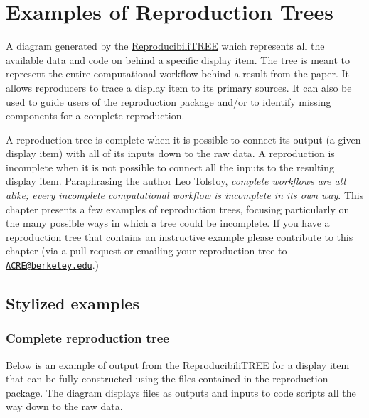 \documentclass[
]{book}
\begin{document}
\hypertarget{examples-of-reproduction-trees}{%
\chapter{Examples of Reproduction Trees}\label{examples-of-reproduction-trees}}

A diagram generated by the \protect\hyperlink{diagram}{ReproducibiliTREE} which represents all the available data and code on behind a specific display item. The tree is meant to represent the entire computational workflow behind a result from the paper. It allows reproducers to trace a display item to its primary sources. It can also be used to guide users of the reproduction package and/or to identify missing components for a complete reproduction.

A reproduction tree is complete when it is possible to connect its output (a given display item) with all of its inputs down to the raw data. A reproduction is incomplete when it is not possible to connect all the inputs to the resulting display item. Paraphrasing the author Leo Tolstoy, \emph{complete workflows are all alike; every incomplete computational workflow is incomplete in its own way}. This chapter presents a few examples of reproduction trees, focusing particularly on the many possible ways in which a tree could be incomplete. If you have a reproduction tree that contains an instructive example please \protect\hyperlink{contrib-guide}{contribute} to this chapter (via a pull request or emailing your reproduction tree to \href{mailto:ACRE@berkeley.edu}{\nolinkurl{ACRE@berkeley.edu}}.)

\hypertarget{stylized-examples}{%
\section{Stylized examples}\label{stylized-examples}}

\hypertarget{complete-reproduction-tree}{%
\subsection{Complete reproduction tree}\label{complete-reproduction-tree}}

Below is an example of output from the \protect\hyperlink{diagram}{ReproducibiliTREE} for a display item that can be fully constructed using the files contained in the reproduction package. The diagram displays files as outputs and inputs to code scripts all the way down to the raw data.
\end{document}
